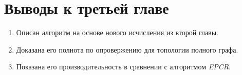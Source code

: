 \newpage
\section{Выводы к третьей главе}
\begin{enumerate}
	\item Описан алгоритм на основе нового исчисления из второй главы.
    \item Доказана его полнота по опровержению для топологии полного графа.
    \item Показана его производительность в сравнении с алгоритмом \emph{EPCR}.
\end{enumerate}